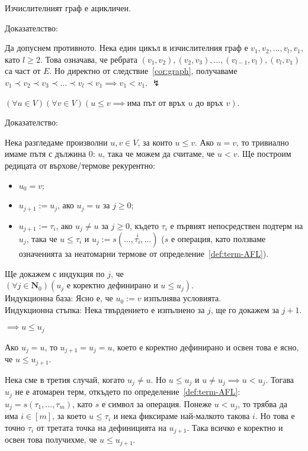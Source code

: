 \documentclass[12pt,twoside,a4paper]{article}
\begin{document}
	\begin{statement}\label{stmnt:graph-acyclic} Изчислителният граф е ацикличен.
		
		\noindent Доказателство:
		
		Да допуснем противното. Нека един цикъл в изчислителния граф е $v_1, v_2, ..., v_l, v_1$, като $l \ge 2$. Това означава, че ребрата $(v_1, v_2), (v_2, v_3), \dots, (v_{l-1}, v_l), (v_l, v_1)$ са част от $E$. Но директно от следствие~\ref{cor:graph}, получаваме $v_1 \prec v_2 \prec v_3 \prec \dots \prec v_l \prec v_1 \implies v_1 < v_1$. $\lightning$
	\end{statement}
	
	\begin{statement}\label{stmnt:graph-subterms-path} $(\forall u \in V)(\forall v \in V)(u \le v \implies\text{има път от връх } u\text{ до връх }v)$.
		
		\noindent Доказателство:
		
		Нека разгледаме произволни $u, v \in V$, за които $u \le v$. Ако $u=v$, то тривиално имаме пътя с дължина 0: $u$, така че можем да считаме, че $u < v$. Ще построим редицата от върхове/термове рекурентно:
		\begin{itemize}
			\item $u_0=v$;
			\item $u_{j+1} := u_j$, ако $u_j = u$ за $j \ge 0$;
			\item $u_{j+1} := \tau_i$, ако $u_j \neq u$ за $j \ge 0$, където $\tau_i$ е първият непосредствен подтерм на $u_j$, така че $u \leq \tau_i$ и $u_j := s(\dots, \overset{i}{\tau_i}, \dots)$ ($s$ е операция, като ползваме означенията за неатомарни термове от определение~\ref{def:term-AFL}).
		\end{itemize}
		Ще докажем с индукция по $j$, че $(\forall j \in \mathbf{N}_0)(u_j\text{ е коректно дефинирано и } u \leq u_j)$.\\
		\indent Индукционна база: Ясно е, че $u_0 := v$ изпълнява условията.\\
		\indent Индукционна стъпка: Нека твърдението е изпълнено за $j$, ще го докажем за $j+1$.
		
		\noindent$\implies u \leq u_j$
		
		\newpage
		Ако $u_j = u$, то $u_{j+1}=u_j=u$, което е коректно дефинирано и освен това е ясно, че $u \leq u_{j+1}$.
		
		Нека сме в третия случай, когато $u_j \neq u$. Но $u \leq u_j$ и $u \neq u_j \implies u < u_j$. Тогава $u_j$ не е атомарен терм, откъдето по определение~\ref{def:term-AFL}: $u_j = s(\tau_1, \dots, \tau_m)$, като $s$ е символ за операция. Понеже $u < u_j$, то трябва да има $i \in [m]$, за което $u \leq \tau_i$ и нека фиксираме най-малкото такова $i$. Но това е точно $\tau_i$ от третата точка на дефиницията на $u_{j+1}$. Така всичко е коректно и освен това получихме, че $u \leq u_{j+1}$.
		

\end{statement}
\end{document}

